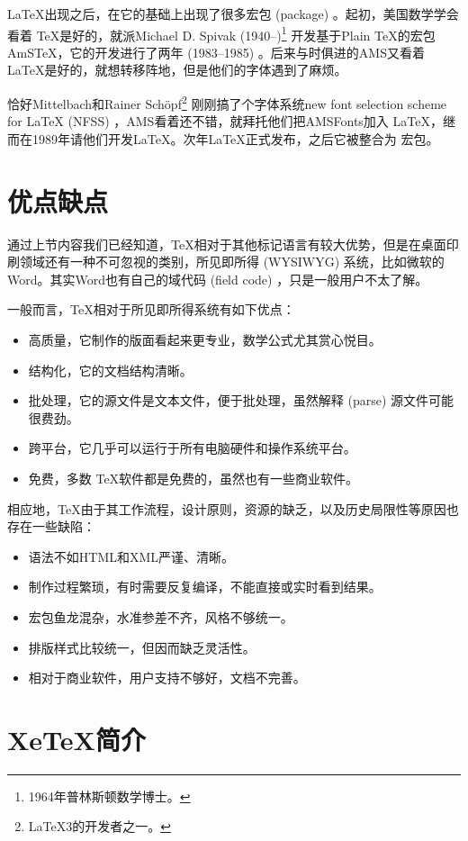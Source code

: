 \LaTeX 出现之后，在它的基础上出现了很多宏包 (package) 。起初，美国数学学会 {} 看着 \TeX 是好的，就派Michael D. Spivak (1940--)\footnote{1964年普林斯顿数学博士。} 开发基于Plain \TeX 的宏包AmS\TeX{}，它的开发进行了两年 (1983--1985) 。后来与时俱进的AMS又看着 \LaTeX 是好的，就想转移阵地，但是他们的字体遇到了麻烦。

恰好Mittelbach和Rainer Schöpf\footnote{\LaTeX 3的开发者之一。} 刚刚搞了个字体系统new font selection scheme for \LaTeX{} (NFSS) ，AMS看着还不错，就拜托他们把AMSFonts加入 \LaTeX，继而在1989年请他们开发\AmS\LaTeX{}。次年\AmS\LaTeX 正式发布，之后它被整合为 \AmS 宏包。

\section{优点缺点}

通过上节内容我们已经知道，\TeX 相对于其他标记语言有较大优势，但是在桌面印刷领域还有一种不可忽视的类别，所见即所得 (WYSIWYG) 系统，比如微软的Word。其实Word也有自己的域代码 (field code) ，只是一般用户不太了解。

一般而言，\TeX 相对于所见即所得系统有如下优点：
\begin{itemize}
  \item  高质量，它制作的版面看起来更专业，数学公式尤其赏心悦目。
  \item  结构化，它的文档结构清晰。
  \item  批处理，它的源文件是文本文件，便于批处理，虽然解释 (parse) 源文件可能很费劲。
  \item  跨平台，它几乎可以运行于所有电脑硬件和操作系统平台。
  \item  免费，多数 \TeX 软件都是免费的，虽然也有一些商业软件。
\end{itemize}

相应地，\TeX 由于其工作流程，设计原则，资源的缺乏，以及历史局限性等原因也存在一些缺陷：
\begin{itemize}
  \item  语法不如HTML和XML严谨、清晰。
  \item  制作过程繁琐，有时需要反复编译，不能直接或实时看到结果。
  \item  宏包鱼龙混杂，水准参差不齐，风格不够统一。
  \item  排版样式比较统一，但因而缺乏灵活性。
  \item  相对于商业软件，用户支持不够好，文档不完善。
\end{itemize}


\section{XeTeX简介}

